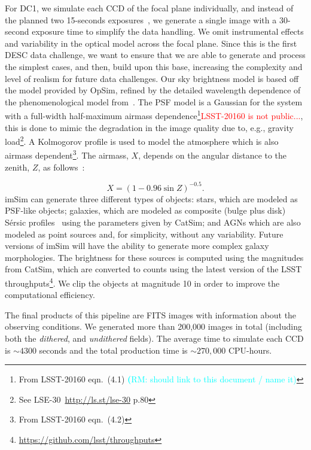 \documentclass[twocolumn]{aastex62}
\newcommand{\rachel}[1]{{\textcolor{cyan}{{\textbf (RM: #1)}}}}
\begin{document}
For DC1, we simulate each CCD of the focal plane individually, and instead of the planned two 15-seconds exposures~\citep{Overview}, we generate a single image with a 30-second exposure time to simplify the data handling. We omit instrumental effects and variability in the optical model across the focal plane. Since this is the first DESC data challenge, we want to ensure that we are able to generate and process the simplest cases, and then, build upon this base, increasing the complexity and level of realism for future data challenges. Our sky brightness model is based off the \citet{1991PASP..103.1033K} model provided by OpSim, refined by the detailed wavelength dependence of the phenomenological model from~\citet{2016SPIE.9910E..1AY}. The PSF model is a Gaussian for the system with a full-width half-maximum airmass dependence\footnote{From LSST-20160 eqn.~(4.1) \rachel{should link to this document / name it}}\textcolor{red}{LSST-20160 is not public...}, this is done to mimic the degradation in the image quality due to, e.g., gravity load\footnote{See LSE-30~\url{http://ls.st/lse-30} p.80}. A Kolmogorov profile is used to model the atmosphere which is also airmass dependent\footnote{From LSST-20160 eqn.~(4.2)}. The airmass, $X$, depends on the angular distance to the zenith, $Z$, as follows~\citep{1991PASP..103.1033K}:

\begin{equation}
X = (1 - 0.96\sin{Z})^{-0.5}.
\end{equation}
imSim can generate three different types of objects: stars, which are modeled as PSF-like objects; galaxies, which are modeled as composite (bulge plus disk) S\'{e}rsic profiles~\citep{1963BAAA....6...41S} using
the parameters given by CatSim; and AGNs which are also modeled as point sources and, for simplicity, without any variability. Future versions of imSim will have the ability to generate more complex galaxy morphologies. The brightness for these sources is computed using the magnitudes from CatSim, which are converted to counts using the latest version of the LSST throughputs\footnote{\url{https://github.com/lsst/throughputs}}. We clip the objects at magnitude 10 in order to improve the computational efficiency.

The final products of this pipeline are FITS images with information about the observing conditions. We generated more than 200,000 images in total (including both the \textit{dithered}, and \textit{undithered} fields). The average time to simulate each CCD is $\sim 4300$ seconds and the total production time is $\sim 270,000$ CPU-hours.
\end{document}
